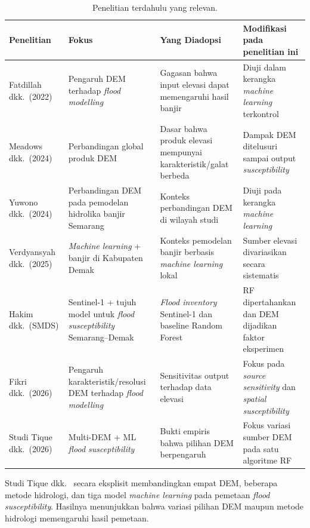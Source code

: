 \documentclass[12pt,a4paper]{article}
\newenvironment{adjustbox}[1]{%
  \begin{lrbox}{\adjboxtemp}%
}{%
  \end{lrbox}%
  \ifdim\wd\adjboxtemp>\textwidth
    \resizebox{\textwidth}{!}{\usebox{\adjboxtemp}}%
  \else
    \usebox{\adjboxtemp}%
  \fi
}
\begin{document}
\begin{table}[!htbp]
\centering
\caption{Penelitian terdahulu yang relevan.}
\label{tab:prior}
\begin{adjustbox}{max width=\textwidth}
\begin{tabular}{>{\raggedright}p{2.6cm}
                >{\raggedright}p{3.6cm}
                >{\raggedright}p{3.8cm}
                >{\raggedright\arraybackslash}p{3.8cm}}
\toprule
\textbf{Penelitian} & \textbf{Fokus} & \textbf{Yang Diadopsi} & \textbf{Modifikasi pada penelitian ini} \\
\midrule
Fatdillah dkk.\ (2022) \citep{fatdillah2022} & Pengaruh DEM terhadap \textit{flood modelling} & Gagasan bahwa input elevasi dapat memengaruhi hasil banjir & Diuji dalam kerangka \textit{machine learning} terkontrol \\
Meadows dkk.\ (2024) \citep{meadows2024} & Perbandingan global produk DEM & Dasar bahwa produk elevasi mempunyai karakteristik/galat berbeda & Dampak DEM ditelusuri sampai output \textit{susceptibility} \\
Yuwono dkk.\ (2024) \citep{yuwono2024} & Perbandingan DEM pada pemodelan hidrolika banjir Semarang & Konteks perbandingan DEM di wilayah studi & Diuji pada kerangka \textit{machine learning} \\
Verdyansyah dkk.\ (2025) \citep{verdyansyah2025} & \textit{Machine learning} + banjir di Kabupaten Demak & Konteks pemodelan banjir berbasis \textit{machine learning} lokal & Sumber elevasi divariasikan secara sistematis \\
Hakim dkk.\ (SMDS) \citep{hakim2026} & Sentinel-1 + tujuh model untuk \textit{flood susceptibility} Semarang--Demak & \textit{Flood inventory} Sentinel-1 dan baseline Random Forest & RF dipertahankan dan DEM dijadikan faktor eksperimen \\
Fikri dkk.\ (2026) \citep{fikri2026} & Pengaruh karakteristik/resolusi DEM terhadap \textit{flood modelling} & Sensitivitas output terhadap data elevasi & Fokus pada \textit{source sensitivity} dan \textit{spatial susceptibility} \\
Studi Tique dkk.\ (2026) \citep{Tique2026} & Multi-DEM + ML \textit{flood susceptibility} & Bukti empiris bahwa pilihan DEM berpengaruh & Fokus variasi sumber DEM pada satu algoritme RF \\
\bottomrule
\end{tabular}
\end{adjustbox}
\end{table}

Studi Tique dkk.\ \citep{Tique2026} secara eksplisit membandingkan empat DEM,
beberapa metode hidrologi, dan tiga model \textit{machine learning} pada
pemetaan \textit{flood susceptibility}. Hasilnya menunjukkan bahwa variasi
pilihan DEM maupun metode hidrologi memengaruhi hasil pemetaan.
\end{document}
